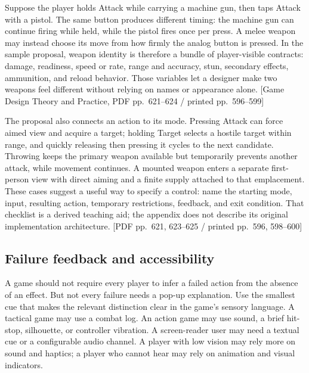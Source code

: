 \hypertarget{05-engine-i-ch009-a-weapon-spec-is-a-set-of-decisions-the-player-can-feel}{}

Suppose the player holds Attack while carrying a machine gun, then taps Attack with a pistol. The same button produces different timing: the machine gun can continue firing while held, while the pistol fires once per press. A melee weapon may instead choose its move from how firmly the analog button is pressed. In the sample proposal, weapon identity is therefore a bundle of player-visible contracts: damage, readiness, speed or rate, range and accuracy, stun, secondary effects, ammunition, and reload behavior. Those variables let a designer make two weapons feel different without relying on names or appearance alone. {[}Game Design Theory and Practice, PDF pp.~621--624 / printed pp.~596--599{]}

The proposal also connects an action to its mode. Pressing Attack can force aimed view and acquire a target; holding Target selects a hostile target within range, and quickly releasing then pressing it cycles to the next candidate. Throwing keeps the primary weapon available but temporarily prevents another attack, while movement continues. A mounted weapon enters a separate first-person view with direct aiming and a finite supply attached to that emplacement. These cases suggest a useful way to specify a control: name the starting mode, input, resulting action, temporary restrictions, feedback, and exit condition. That checklist is a derived teaching aid; the appendix does not describe its original implementation architecture. {[}PDF pp.~621, 623--625 / printed pp.~596, 598--600{]}

\subsection{Failure feedback and accessibility}\label{05-engine-i-ch009-failure-feedback-and-accessibility}

\hypertarget{05-engine-i-ch009-failure-feedback-and-accessibility}{}

A game should not require every player to infer a failed action from the absence of an effect. But not every failure needs a pop-up explanation. Use the smallest cue that makes the relevant distinction clear in the game's sensory language. A tactical game may use a combat log. An action game may use sound, a brief hit-stop, silhouette, or controller vibration. A screen-reader user may need a textual cue or a configurable audio channel. A player with low vision may rely more on sound and haptics; a player who cannot hear may rely on animation and visual indicators.

